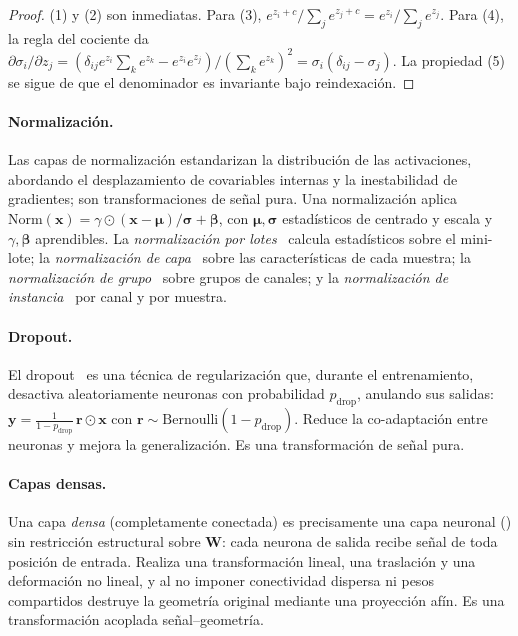 \begin{proof}
(1) y (2) son inmediatas. Para (3), $e^{z_i + c}/\sum_j e^{z_j + c} =
e^{z_i}/\sum_j e^{z_j}$. Para (4), la regla del cociente da
$\partial \sigma_i/\partial z_j = (\delta_{ij}e^{z_i}\sum_k e^{z_k} -
e^{z_i}e^{z_j})/(\sum_k e^{z_k})^2 = \sigma_i(\delta_{ij} - \sigma_j)$. La
propiedad (5) se sigue de que el denominador es invariante bajo reindexaci\'on.
\end{proof}

\paragraph{Normalizaci\'on.}
Las capas de normalizaci\'on estandarizan la distribuci\'on de las activaciones,
abordando el desplazamiento de covariables internas y la inestabilidad de
gradientes; son transformaciones de se\~nal pura. Una normalizaci\'on aplica
$\mathrm{Norm}(\mathbf{x}) = \gamma \odot (\mathbf{x} - \boldsymbol{\mu})/
\boldsymbol{\sigma} + \boldsymbol{\beta}$, con $\boldsymbol{\mu},
\boldsymbol{\sigma}$ estad\'isticos de centrado y escala y $\gamma,
\boldsymbol{\beta}$ aprendibles. La \emph{normalizaci\'on por
lotes}~\citep{ioffe2015batch} calcula estad\'isticos sobre el mini-lote; la
\emph{normalizaci\'on de capa}~\citep{ba2016layer} sobre las caracter\'isticas de
cada muestra; la \emph{normalizaci\'on de grupo}~\citep{wu2018group} sobre grupos
de canales; y la \emph{normalizaci\'on de instancia}~\citep{ulyanov2016instance}
por canal y por muestra.

\paragraph{Dropout.}
El dropout~\citep{srivastava2014dropout} es una t\'ecnica de regularizaci\'on que,
durante el entrenamiento, desactiva aleatoriamente neuronas con probabilidad
$p_{\mathrm{drop}}$, anulando sus salidas: $\mathbf{y} =
\frac{1}{1-p_{\mathrm{drop}}}\,\mathbf{r} \odot \mathbf{x}$ con $\mathbf{r} \sim
\mathrm{Bernoulli}(1-p_{\mathrm{drop}})$. Reduce la co-adaptaci\'on entre neuronas
y mejora la generalizaci\'on. Es una transformaci\'on de se\~nal pura.

\paragraph{Capas densas.}
Una capa \emph{densa} (completamente conectada) es precisamente una capa neuronal
() sin restricci\'on estructural sobre $\mathbf{W}$: cada
neurona de salida recibe se\~nal de toda posici\'on de entrada. Realiza una
transformaci\'on lineal, una traslaci\'on y una deformaci\'on no lineal, y al no
imponer conectividad dispersa ni pesos compartidos destruye la geometr\'ia original
mediante una proyecci\'on af\'in. Es una transformaci\'on acoplada se\~nal--geometr\'ia.

